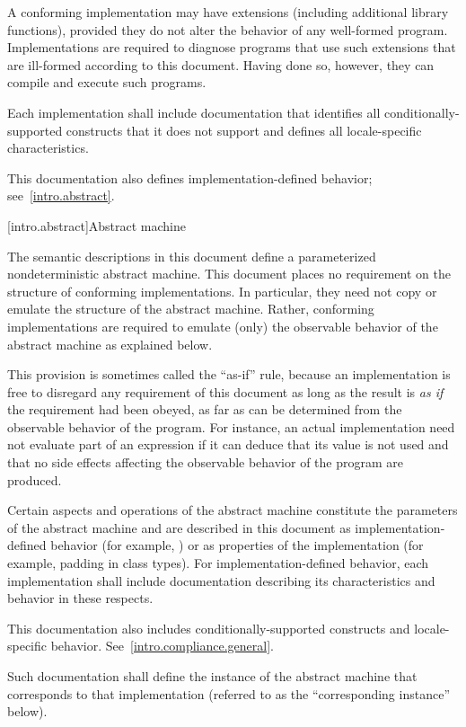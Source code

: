 \pnum
A conforming implementation may have extensions (including
additional library functions), provided they do not alter the
behavior of any well-formed program.
Implementations are required to diagnose programs that use such
extensions that are ill-formed according to this document.
Having done so, however, they can compile and execute such programs.

\pnum
Each implementation shall include documentation that identifies all
conditionally-supported constructs
that it does not support and defines all locale-specific characteristics.
\begin{footnote}
This documentation also defines implementation-defined behavior;
see~\ref{intro.abstract}.
\end{footnote}
%
%

[intro.abstract]{Abstract machine}

\pnum
{}%
%
The semantic descriptions in this document define a
parameterized nondeterministic abstract machine. This document
places no requirement on the structure of conforming
implementations. In particular, they need not copy or emulate the
structure of the abstract machine.
%
%
Rather, conforming implementations are required to emulate (only) the observable
behavior of the abstract machine as explained below.
\begin{footnote}
This provision is
sometimes called the ``as-if'' rule, because an implementation is free to
disregard any requirement of this document as long as the result
is \emph{as if} the requirement had been obeyed, as far as can be determined
from the observable behavior of the program. For instance, an actual
implementation need not evaluate part of an expression if it can deduce that its
value is not used and that no
%
side effects affecting the
observable behavior of the program are produced.
\end{footnote}

\pnum
{}%
Certain aspects and operations of the abstract machine
constitute the parameters of the abstract machine and
are described in this
document as implementation-defined behavior (for example,
)
or as properties of the implementation (for example, padding in class types).
For implementation-defined behavior,
each implementation shall include documentation describing its characteristics
and behavior in these respects.
\begin{footnote}
This documentation also includes
conditionally-supported constructs and locale-specific behavior.
See~\ref{intro.compliance.general}.
\end{footnote}
Such documentation shall define the instance of the
abstract machine that corresponds to that implementation (referred to as the
``corresponding instance'' below).

